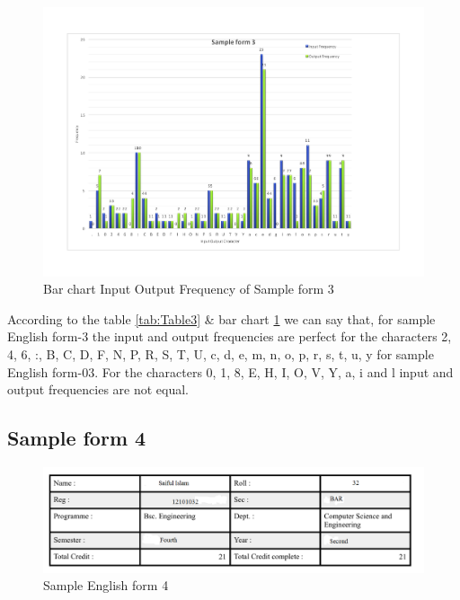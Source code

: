 \begin{figure}[H]
\centering
\includegraphics[width=1\textwidth]{form3.pdf}
\caption {Bar chart Input Output Frequency of Sample form 3}
\label {fig:bar3}
\end{figure}
According to the table \ref{tab:Table3} \& bar chart \ref{fig:bar3} we can say that, for sample English form-3 the input and output frequencies are perfect for the characters 2, 4, 6, :, B, C, D, F, N, P, R, S, T, U, c, d, e, m, n, o, p, r, s, t, u, y for sample English form-03. For the characters 0, 1, 8, E, H, I, O, V, Y, a, i and l input and output frequencies are not equal. 

\subsection{Sample form 4}

\begin{figure}[H]
\centering
\includegraphics[width=1\textwidth]{form4.png}
\caption {Sample English form 4}
\label {fig:form4}
\end{figure}

